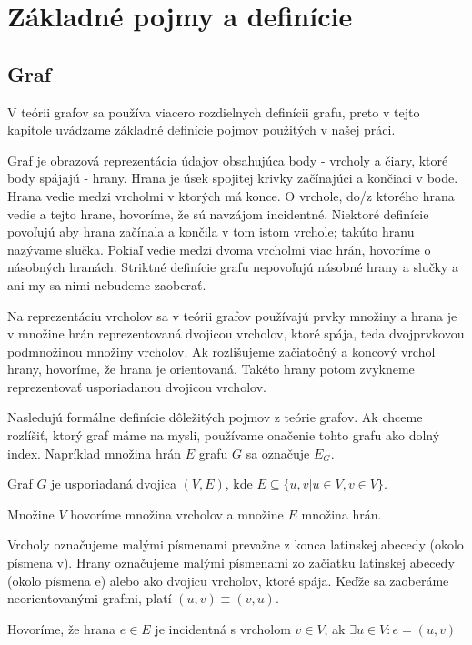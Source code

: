 \chapter{Základné pojmy a definície}
\thispagestyle{empty}


\section{Graf}
V teórii grafov sa používa viacero rozdielnych definícii grafu, preto v
tejto kapitole uvádzame základné definície pojmov použitých v našej práci.

Graf je obrazová reprezentácia údajov obsahujúca body - vrcholy a čiary,
ktoré body spájajú - hrany. Hrana je úsek spojitej krivky začínajúci a 
končiaci v bode. Hrana vedie medzi vrcholmi v ktorých má konce.
O vrchole, do/z ktorého hrana vedie a tejto hrane, hovoríme, 
že sú navzájom incidentné. Niektoré definície povoľujú aby hrana začínala a 
končila v tom istom vrchole; takúto hranu nazývame slučka. 
Pokiaľ vedie medzi dvoma vrcholmi viac hrán, hovoríme o násobných hranách. 
Striktné definície grafu nepovoľujú násobné hrany a slučky a ani my sa nimi 
nebudeme zaoberať.

Na reprezentáciu vrcholov sa v teórii grafov používajú prvky množiny a 
hrana je v množine 
hrán reprezentovaná dvojicou vrcholov, ktoré spája, teda dvojprvkovou
podmnožinou množiny vrcholov. Ak rozlišujeme začiatočný a koncový vrchol
hrany, hovoríme, že hrana je orientovaná. Takéto hrany potom zvykneme
reprezentovať usporiadanou dvojicou vrcholov.

Nasledujú formálne definície dôležitých pojmov z teórie grafov. Ak chceme
rozlíšiť, ktorý graf máme na mysli, používame onačenie tohto grafu ako dolný
index. Napríklad množina hrán $E$ grafu $G$ sa označuje $E_{G}$.

\begin{defin}
Graf $G$ je usporiadaná dvojica $(V,E)$, kde
$E \subseteq \{u,v | u \in V, v \in V\}$.

Množine $V$ hovoríme množina vrcholov a množine $E$ množina hrán.

Vrcholy označujeme malými písmenami prevažne z konca latinskej abecedy 
(okolo písmena v). Hrany označujeme malými písmenami zo začiatku latinskej 
abecedy (okolo písmena e) alebo ako dvojicu vrcholov, ktoré spája. Keďže sa
zaoberáme neorientovanými grafmi, platí
$(u,v) \equiv (v,u)$.
\end{defin}

\begin{defin}
Hovoríme, že hrana $e \in E$ je incidentná s vrcholom $v \in V$, ak
$\exists  u \in  V : e = (u,v) $
\end{defin}

